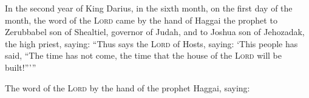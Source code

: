 
\begin{inparaenum}
     In the second year of King Darius, in the sixth month, on the first day of the month, the word of the \textsc{Lord} came by the hand of Haggai the prophet to Zerubbabel son of Shealtiel, governor of Judah, and to Joshua son of Jehozadak, the high priest, saying:%
     ``Thus says the \textsc{Lord} of Hosts, saying: `This people has said, ``The time has not come, the time that the house of the \textsc{Lord} will be built!''\thinspace'\thinspace''%
    
     The word of the \textsc{Lord} by the hand of the prophet Haggai, saying:\smallskip%
    
    
    \pvca{}%
    
    
    \pvca{}%
    
    
    \pvcb{}{}%
    
    \pvcb{}{}\bigskip%
    
     \smallskip%
    
    \pvca{}%
    
    
    \pvcc{}{}{}%
    
    
    \pvcb{}{}%
    
    \pvcb{}{}%
    
    
    
    \pvcb{}{}%
    
    \pvcb{}{}\bigskip%
    
    
\end{inparaenum}
